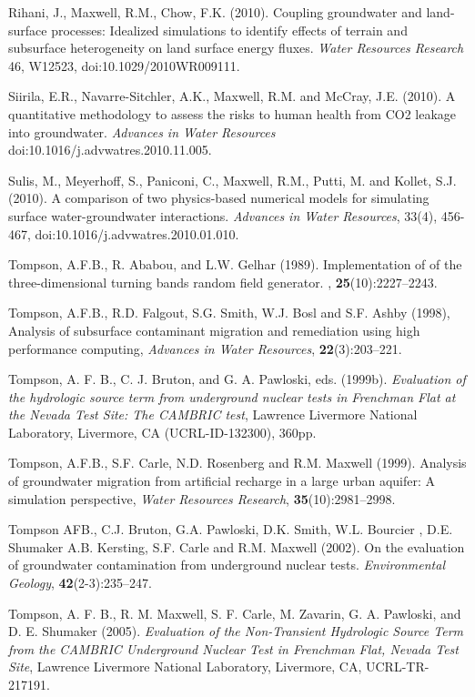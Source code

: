\begin{thebibliography}{99}
Rihani, J., Maxwell, R.M., Chow, F.K. (2010). Coupling groundwater and land-surface processes: Idealized simulations to identify effects of terrain and subsurface heterogeneity on land surface energy fluxes. {\em Water Resources Research} 46, W12523, doi:10.1029/2010WR009111.

Siirila, E.R., Navarre-Sitchler, A.K., Maxwell, R.M. and McCray, J.E. (2010). A quantitative methodology to assess the risks to human health from CO2 leakage into groundwater. {\em Advances in Water Resources} doi:10.1016/j.advwatres.2010.11.005.

Sulis, M., Meyerhoff, S., Paniconi, C., Maxwell, R.M., Putti, M. and Kollet, S.J. (2010). A comparison of two physics-based numerical models for simulating surface water-groundwater interactions. { \em Advances in Water Resources}, 33(4), 456-467, doi:10.1016/j.advwatres.2010.01.010.

Tompson, A.F.B., R. Ababou, and L.W. Gelhar (1989).
\newblock Implementation of of the three-dimensional turning bands random field
  generator.
, {\bf 25}(10):2227--2243.

  Tompson, A.F.B., R.D. Falgout, S.G. Smith, W.J. Bosl and
S.F. Ashby (1998), Analysis of subsurface contaminant migration and
remediation using high performance computing, {\em Advances in Water
Resources}, { \bf 22}(3):203--221.

Tompson, A. F. B., C. J. Bruton, and G. A. Pawloski, eds. (1999b). {\em Evaluation of the hydrologic source term from underground nuclear tests in Frenchman Flat at the Nevada Test Site: The CAMBRIC test}, Lawrence Livermore National Laboratory, Livermore, CA (UCRL-ID-132300), 360pp. 

  Tompson, A.F.B., S.F. Carle, N.D. Rosenberg and R.M. Maxwell
 (1999). Analysis of groundwater migration from artificial recharge in a large
 urban aquifer: A simulation perspective, {\em Water Resources
Research}, {\bf 35}(10):2981--2998.

Tompson AFB., C.J. Bruton, G.A. Pawloski, D.K. Smith, W.L. Bourcier , D.E. Shumaker A.B. Kersting, S.F. Carle and R.M. Maxwell (2002). On the evaluation of groundwater contamination from underground nuclear tests.  {\em Environmental Geology}, {\bf 42}(2-3):235--247.

Tompson, A. F. B., R. M. Maxwell, S. F. Carle, M. Zavarin, G. A. Pawloski, and D. E. Shumaker (2005). {\em Evaluation of the Non-Transient Hydrologic Source Term from the CAMBRIC Underground Nuclear Test in Frenchman Flat, Nevada Test Site}, Lawrence Livermore National Laboratory, Livermore, CA, UCRL-TR-217191.


\end{thebibliography}
